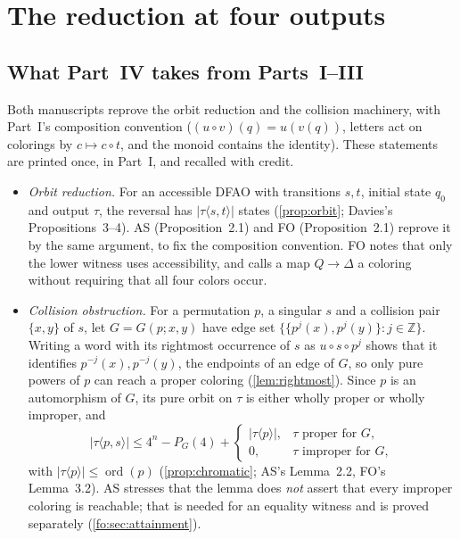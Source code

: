\documentclass[11pt,a4paper]{article}
\numberwithin{equation}{section}
\theoremstyle{definition}
\theoremstyle{remark}
\newcommand{\Z}{\mathbb Z}
\newcommand{\D}{\Delta}
\newcommand{\ord}{\operatorname{ord}}
\begin{document}
\section{The reduction at four outputs}\label{fo:sec:reduction}

\subsection{What Part~IV takes from Parts~I--III}\label{fo:sec:imported}

Both manuscripts reprove the orbit reduction and the collision machinery,
with Part~I's composition convention ($(u\circ v)(q)=u(v(q))$, letters act on
colorings by $c\mapsto c\circ t$, and the monoid contains the identity).
These statements are printed once, in Part~I, and recalled with credit.
\begin{itemize}
\item \emph{Orbit reduction.} For an accessible DFAO with transitions $s,t$,
 initial state $q_0$ and output $\tau$, the reversal has
 $|\tau\langle s,t\rangle|$ states (\cref{prop:orbit}; Davies's
 Propositions~3--4). AS (Proposition~2.1) and FO (Proposition~2.1) reprove
 it by the same argument, to fix the composition convention. FO notes that
 only the lower witness uses accessibility, and calls a map $Q\to\D$ a
 coloring without requiring that all four colors occur.
\item \emph{Collision obstruction.} For a permutation $p$, a singular $s$ and
 a collision pair $\{x,y\}$ of $s$, let $G=G(p;x,y)$ have edge set
 $\{\{p^j(x),p^j(y)\}:j\in\Z\}$. Writing a word with its rightmost
 occurrence of $s$ as $u\circ s\circ p^j$ shows that it identifies
 $p^{-j}(x),p^{-j}(y)$, the endpoints of an edge of $G$, so only pure powers
 of $p$ can reach a proper coloring (\cref{lem:rightmost}). Since $p$ is an
 automorphism of $G$, its pure orbit on $\tau$ is either wholly proper or
 wholly improper, and
 \begin{equation}\label{fo:eq:sharpgraph}
 |\tau\langle p,s\rangle|\le4^n-P_G(4)+
 \begin{cases}|\tau\langle p\rangle|,&\tau\text{ proper for }G,\\
 0,&\tau\text{ improper for }G,\end{cases}
 \end{equation}
 with $|\tau\langle p\rangle|\le\ord(p)$ (\cref{prop:chromatic}; AS's
 Lemma~2.2, FO's Lemma~3.2). AS stresses that the lemma does \emph{not}
 assert that every improper coloring is reachable; that is needed for an
 equality witness and is proved separately (\cref{fo:sec:attainment}).

\end{itemize}
\end{document}
